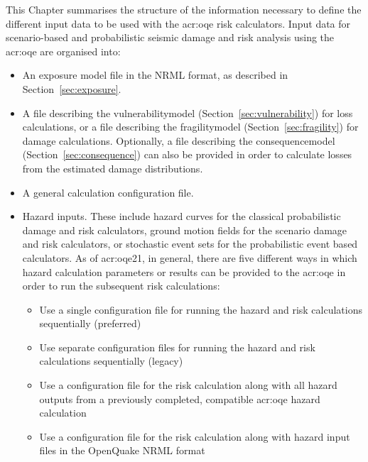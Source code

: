 This Chapter summarises the structure of the information necessary to define
the different input data to be used with the \glsdesc{acr:oqe} risk
calculators. Input data for scenario-based and probabilistic seismic damage
and risk analysis using the \glsdesc{acr:oqe} are organised into:

\begin{itemize}

  \item An exposure model file in the NRML format, as described in 
    Section~\ref{sec:exposure}.

  \item A file describing the \gls{vulnerabilitymodel}
    (Section~\ref{sec:vulnerability}) for loss calculations, or a 
  	file describing the \gls{fragilitymodel} (Section~\ref{sec:fragility})
    for damage calculations. Optionally, a file describing the
    \gls{consequencemodel} (Section~\ref{sec:consequence}) can also be
  	provided in order to calculate losses from the estimated damage
  	distributions.

  \item A general calculation configuration file.

  \item Hazard inputs. These include hazard curves for the classical
    probabilistic damage and risk calculators, ground motion fields for the
    scenario damage and risk calculators, or stochastic event sets for the
    probabilistic event based calculators. As of \glsdesc{acr:oqe21}, in
    general, there are five different ways in which hazard calculation
    parameters or results can be provided to the \glsdesc{acr:oqe} in order to
    run the subsequent risk calculations:

    \begin{itemize}

      \item Use a single configuration file for running the hazard and risk
      calculations sequentially (preferred)

      \item Use separate configuration files for running the hazard and risk
      calculations sequentially (legacy)

      \item Use a configuration file for the risk calculation along with all
      hazard outputs from a previously completed, compatible
      \glsdesc{acr:oqe} hazard calculation


      \item Use a configuration file for the risk calculation along with
      hazard input files in the OpenQuake NRML format

    \end{itemize}

\end{itemize}

